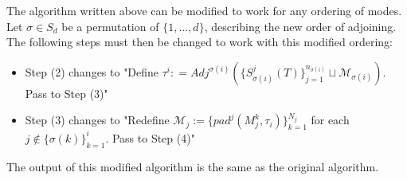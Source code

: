 \documentclass[../Lael_John_MasterThesis_Draft.tex]{subfiles}
\begin{document}
\begin{remark}
    The algorithm written above can be modified to work for any ordering of modes. Let $\sigma \in S_d$ be a permutation of $\{1, \ldots, d\}$, describing the new order of adjoining. The following steps must then be changed to work with this modified ordering: \begin{itemize}
        \item Step (2) changes to "Define $\tau^i: =Adj^{\sigma(i)}(\{S_{\sigma(i)}^j(T)\}_{j=1}^{n_{\sigma(i)}}\sqcup \mathcal{M}_{\sigma(i)})$. Pass to Step (3)"
        \item Step (3) changes to "Redefine $\mathcal{M}_j := \{ pad^j(M_j^k, \tau_i)\}_{k=1}^{N_j}$ for each $j \notin \{\sigma(k)\}_{k=1}^i$. Pass to Step (4)"
    \end{itemize}
    The output of this modified algorithm is the same as the original algorithm.
\end{remark}
\end{document}
